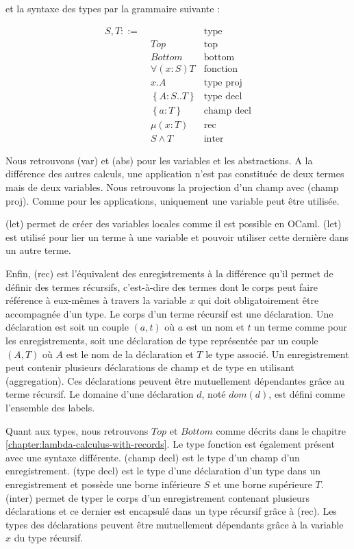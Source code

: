 et la syntaxe des types par la grammaire suivante :

\begin{align*}
  S, T ::= & \, & \text{type} \\
           & \; Top & \text{top} \\
           & \; Bottom & \text{bottom} \\
           & \; \forall(x : S) T & \text{fonction} \\
           & \; x.A & \text{type proj} \\
           & \; \left\{ A : S .. T \right\} & \text{type decl} \\
           & \; \left\{ a : T \right\} & \text{champ decl} \\
           & \; \mu(x : T) & \text{rec} \\
           & \; S \wedge T & \text{inter}
\end{align*}

Nous retrouvons (var) et (abs) pour les variables et les
abstractions.
A la différence des autres calculs, une application n'est pas constituée de deux
termes mais de deux variables. Nous retrouvons la projection d'un champ avec
(champ proj). Comme pour les applications, uniquement une variable peut être
utilisée.

(let) permet de créer des variables locales comme il est possible en OCaml.
(let) est utilisé pour lier un terme à une variable et pouvoir utiliser cette
dernière dans un autre terme.

Enfin, (rec) est l'équivalent des enregistrements à la différence qu'il permet
de définir des termes récursifs, c'est-à-dire des termes
dont le corps peut faire référence à eux-mêmes à travers la variable $x$ qui
doit obligatoirement être accompagnée d'un type. Le
corps d'un terme récursif est une déclaration. Une déclaration est soit un
couple $(a, t)$ où $a$ est un nom et $t$ un terme comme pour les
enregistrements, soit une déclaration de type représentée par un couple $(A,
T)$ où $A$ est le nom de la déclaration et $T$ le type associé. Un enregistrement peut contenir plusieurs déclarations de champ et
de type en utilisant (aggregation). Ces déclarations peuvent être mutuellement
dépendantes grâce au terme récursif.
Le domaine d'une déclaration $d$, noté $dom(d)$, est défini comme l'ensemble des
labels.

Quant aux types, nous retrouvons $Top$ et $Bottom$ comme décrits dans le
chapitre \ref{chapter:lambda-calculus-with-records}. Le type fonction est
également présent avec une syntaxe différente. (champ decl) est le type d'un
champ d'un enregistrement. (type decl) est le type d'une déclaration d'un type
dans un enregistrement et possède une borne inférieure $S$ et une borne
supérieure $T$. (inter) permet de typer le corps d'un enregistrement contenant
plusieurs déclarations et ce dernier est encapsulé dans un type récursif grâce à (rec). Les
types des déclarations peuvent être mutuellement dépendants grâce à la variable
$x$ du type récursif.

